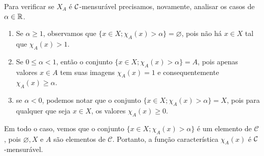 Para verificar se $X_A$ é $\operatorname{\mathcal{C}}$-mensurável precisamos, novamente, analisar os casos de $\alpha \in \mathbb{R}$.
	\begin{enumerate}[label*= (\Roman*)]
		\item Se $\alpha \geq 1$, observamos que $\{x \in X; \chi_A(x)>  \alpha\} = \varnothing$, pois não há $x \in X$ tal que $\chi_A(x) > 1$.  
		\item Se $ 0 \leq \alpha < 1$, então o conjunto $\{x \in X; \chi_A(x)>  \alpha\} = A$, pois apenas valores $x \in A$ tem suas imagens $\chi_A(x) = 1$ e consequentemente $\chi_A(x) \geq \alpha$.
		\item  se $\alpha < 0$, podemos notar que o conjunto $\{x \in X; \chi_A(x)>  \alpha\} = X$, pois para qualquer que seja $x \in X$, os valores $\chi_A(x) \geq 0$.
	\end{enumerate}
Em todo o caso, vemos que o conjunto $\{x \in X; \chi_A(x)>  \alpha\}$ é um elemento de $\mathcal{C}$, pois $\varnothing, X$ e $A$ são elementos de $\mathcal{C}$. Portanto, a função característica $\chi_A(x)$ é $\operatorname{\mathcal{C}}$-mensurável.

